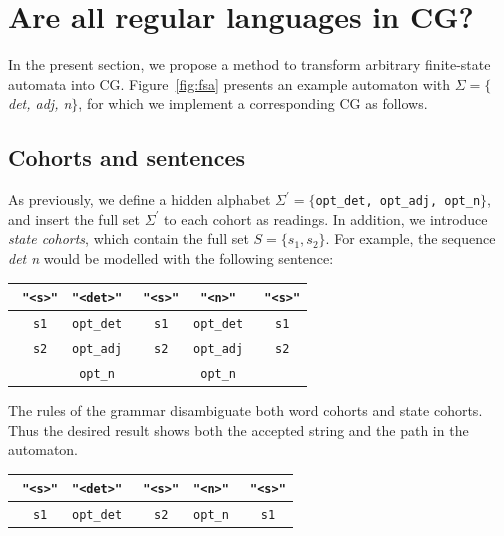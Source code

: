 \documentclass[11pt]{article}
\def\t#1{\texttt{#1}}
\def\h#1{{\tt \color{gray} #1}}
\def\swf{\h{"<s>"}}
\begin{document}
\section{Are all regular languages in CG?}
In the present section, we propose a method to transform arbitrary finite-state
automata into CG. Figure~\ref{fig:fsa} presents an example automaton with
$\Sigma = \{$\emph{det, adj, n}$\}$, for which we implement a corresponding CG
as follows.

\subsection{Cohorts and sentences}
As previously, we define a hidden alphabet $\Sigma^{\prime} = \{$\t{opt\_det,
  opt\_adj, opt\_n}$\}$, and insert the full set $\Sigma^{\prime}$ to each
cohort as readings. In addition, we introduce \emph{state cohorts}, which
contain the full set $S = \{s_1, s_2\}$. For example, the sequence \emph{det n}
would be modelled with the following sentence:
%
\begin{table}[h]
  \centering\small
  \begin{tabular}{c|c|c|c|c}
    \swf   & \t{"<det>"}  & \swf   & \t{"<n>"} & \swf   \\ \hline
    \h{s1} & \t{opt\_det} & \h{s1} & \t{opt\_det} & \h{s1} \\
    \h{s2} & \t{opt\_adj} & \h{s2} & \t{opt\_adj} & \h{s2} \\
           & \t{opt\_n}   &        & \t{opt\_n}   &        \\
     
  \end{tabular}
\end{table}

%
The rules of the grammar disambiguate both word cohorts and state cohorts. Thus
the desired result shows both the accepted string and the path in the automaton.

\begin{table}[h]
  \centering\small
  \begin{tabular}{c|c|c|c|c}
    \swf   & \t{"<det>"}  & \swf   & \t{"<n>"} & \swf   \\ \hline
    \h{s1} & \t{opt\_det}      & \h{s2} & \t{opt\_n}        & \h{s1} \\

  \end{tabular}
\end{table}
\end{document}
